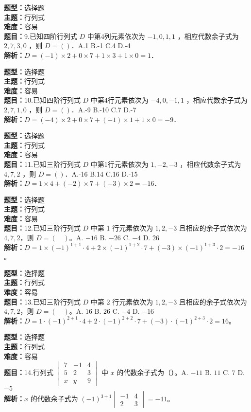 \documentclass{ctexart}
\newenvironment{question}[5]{%
	\noindent\textbf{题型：}#1\\
	\textbf{主题：}#2\\
	\textbf{难度：}#3\\
	\textbf{题目：}#4\\
	\textbf{解析：}#5\\
	\vspace{1em}
}{}
\begin{document}
	\begin{question}
		{选择题}
		{行列式}
		{容易}
		{9.已知四阶行列式 $D$ 中第4列元素依次为 $-1,0,1,1$ ，相应代数余子式为 $2,7,3,0$ ，则 $D=(  )$．A.1 B.-1 C.4 D.-4}
		{$D = (-1) \times 2 + 0 \times 7 + 1 \times 3 + 1 \times 0 = 1$．}
	\end{question}
	
	\begin{question}
		{选择题}
		{行列式}
		{容易}
		{10.已知四阶行列式 $D$ 中第4行元素依次为 $-4,0,-1,1$ ，相应代数余子式为 $2,7,1,0$ ，则 $D=(  )$．A.-9 B.-10 C.7 D.-7}
		{$D = (-4) \times 2 + 0 \times 7 + (-1) \times 1 + 1 \times 0 = -9$．}
	\end{question}
	
	\begin{question}
		{选择题}
		{行列式}
		{容易}
		{11.已知三阶行列式 $D$ 中第1行元素依次为 $1,-2,-3$ ，相应代数余子式为 $4,7,2$ ，则 $D=(  )$．A.-16 B.14 C.16 D.-15}
		{$D = 1 \times 4 + (-2) \times 7 + (-3) \times 2 = -16$．}
	\end{question}
	
	
	\begin{question}
		{选择题}
		{行列式}
		{容易}
		{12.已知三阶行列式 $D$ 中第 1 行元素依次为 $1,2,-3$ 且相应的余子式依次为 $4,7,2$，则 $D=(\quad)$。A. $-16$ \quad B. $-26$ \quad C. $-4$ \quad D. $26$}
		{$D=1 \times(-1)^{1+1} \cdot 4 + 2 \times(-1)^{1+2} \cdot 7 + (-3) \times(-1)^{1+3} \cdot 2 = -16$。}
	\end{question}
	
	\begin{question}
		{选择题}
		{行列式}
		{容易}
		{13.已知三阶行列式 $D$ 中第 2 行元素依次为 $1,2,-3$ 且相应的余子式依次为 $4,7,2$，则 $D=(\quad)$。A. $16$ \quad B. $26$ \quad C. $-4$ \quad D. $-16$}
		{$D=1 \cdot (-1)^{2+1} \cdot 4 + 2 \cdot (-1)^{2+2} \cdot 7 + (-3) \cdot (-1)^{2+3} \cdot 2 = 16$。}
	\end{question}
	
	\begin{question}
		{选择题}
		{行列式}
		{容易}
		{14.行列式 $\begin{vmatrix}7 & -1 & 4 \\ 5 & 2 & 3 \\ x & y & 9\end{vmatrix}$ 中 $x$ 的代数余子式为（\quad）。A. $-11$ \quad B. $11$ \quad C. $7$ \quad D. $-5$}
		{$x$ 的代数余子式为 $(-1)^{3+1} \begin{vmatrix}-1 & 4 \\ 2 & 3\end{vmatrix} = -11$。}
	\end{question}
	
\end{document}
